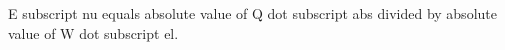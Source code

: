 E subscript nu equals absolute value of Q dot subscript abs divided by absolute value of W dot subscript el.